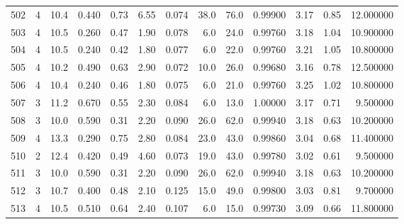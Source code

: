 \begin{tabular}{lrrrrrrrrrrrr}
502  &        4 &           10.4 &             0.440 &         0.73 &            6.55 &      0.074 &                 38.0 &                  76.0 &  0.99900 &  3.17 &       0.85 &  12.000000 \\
503  &        4 &           10.5 &             0.260 &         0.47 &            1.90 &      0.078 &                  6.0 &                  24.0 &  0.99760 &  3.18 &       1.04 &  10.900000 \\
504  &        4 &           10.5 &             0.240 &         0.42 &            1.80 &      0.077 &                  6.0 &                  22.0 &  0.99760 &  3.21 &       1.05 &  10.800000 \\
505  &        4 &           10.2 &             0.490 &         0.63 &            2.90 &      0.072 &                 10.0 &                  26.0 &  0.99680 &  3.16 &       0.78 &  12.500000 \\
506  &        4 &           10.4 &             0.240 &         0.46 &            1.80 &      0.075 &                  6.0 &                  21.0 &  0.99760 &  3.25 &       1.02 &  10.800000 \\
507  &        3 &           11.2 &             0.670 &         0.55 &            2.30 &      0.084 &                  6.0 &                  13.0 &  1.00000 &  3.17 &       0.71 &   9.500000 \\
508  &        3 &           10.0 &             0.590 &         0.31 &            2.20 &      0.090 &                 26.0 &                  62.0 &  0.99940 &  3.18 &       0.63 &  10.200000 \\
509  &        4 &           13.3 &             0.290 &         0.75 &            2.80 &      0.084 &                 23.0 &                  43.0 &  0.99860 &  3.04 &       0.68 &  11.400000 \\
510  &        2 &           12.4 &             0.420 &         0.49 &            4.60 &      0.073 &                 19.0 &                  43.0 &  0.99780 &  3.02 &       0.61 &   9.500000 \\
511  &        3 &           10.0 &             0.590 &         0.31 &            2.20 &      0.090 &                 26.0 &                  62.0 &  0.99940 &  3.18 &       0.63 &  10.200000 \\
512  &        3 &           10.7 &             0.400 &         0.48 &            2.10 &      0.125 &                 15.0 &                  49.0 &  0.99800 &  3.03 &       0.81 &   9.700000 \\
513  &        4 &           10.5 &             0.510 &         0.64 &            2.40 &      0.107 &                  6.0 &                  15.0 &  0.99730 &  3.09 &       0.66 &  11.800000 \\

\end{tabular}
